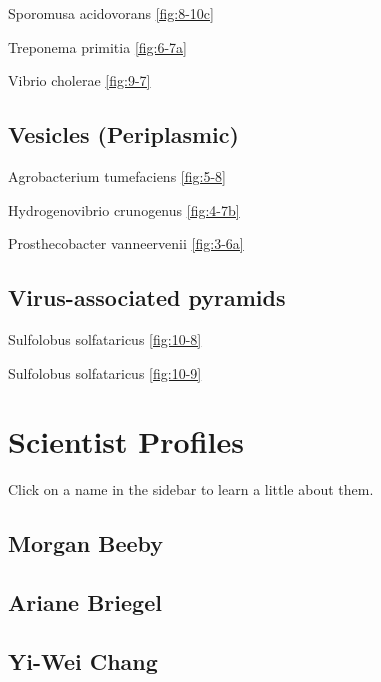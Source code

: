 \documentclass[]{tufte-book}
\begin{document}
Sporomusa acidovorans \ref{fig:8-10c}

Treponema primitia \ref{fig:6-7a}

Vibrio cholerae \ref{fig:9-7}

\section*{Vesicles (Periplasmic)}\label{vesicles-periplasmic}

Agrobacterium tumefaciens \ref{fig:5-8}

Hydrogenovibrio crunogenus \ref{fig:4-7b}

Prosthecobacter vanneervenii \ref{fig:3-6a}

\section*{Virus-associated pyramids}\label{virus-associated-pyramids}

Sulfolobus solfataricus \ref{fig:10-8}

Sulfolobus solfataricus \ref{fig:10-9}

\chapter{Scientist Profiles}\label{scientist-profiles}

Click on a name in the sidebar to learn a little about them.

\hypertarget{morgan_beeby}{\section*{Morgan Beeby}\label{morgan_beeby}}

\hypertarget{ariane_briegel}{\section*{Ariane
Briegel}\label{ariane_briegel}}

\hypertarget{yi-wei_chang}{\section*{Yi-Wei Chang}\label{yi-wei_chang}}
\end{document}
